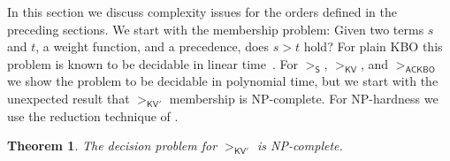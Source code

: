 \documentclass{tlp}
\newtheorem{theorem}{Theorem}[section]
\newcommand{\m}[1]{\mathsf{#1}}
\newcommand{\mr}[1]{\mathrm{#1}}
\newcommand{\ackbo}{\mr{\m{ACKBO}}}
\newcommand{\steinbach}{\mr{\m{S}}}
\newcommand{\KV}{\mr{\m{KV}}}
\newcommand{\KVC}{\mr{\m{KV'}}}
\begin{document}
In this section we discuss complexity issues for the orders
defined in the preceding sections. We start with the membership
problem: Given two terms $s$ and $t$, a weight function, and a precedence,
does $s > t$ hold? For plain KBO this problem is known to be
decidable in linear time~\cite{L06b}. For
$>_{\steinbach}$, $>_\KV$, and $>_\ackbo$ we show the problem to be 
decidable in polynomial time, but we start with the unexpected result that
$>_\KVC$ membership is NP-complete. For NP-hardness we use the
reduction technique of .





\begin{theorem}
\label{thm:KVC NP-hard}
The decision problem for $>_\KVC$ is NP-complete.
\end{theorem}
\end{document}
